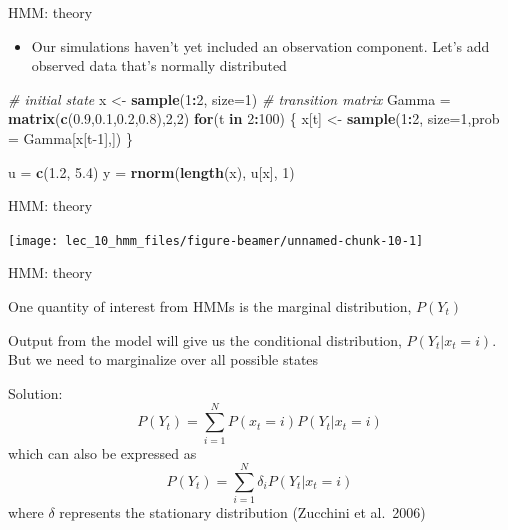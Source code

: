 \documentclass[
  ignorenonframetext,
]{beamer}
\newenvironment{Shaded}{\begin{snugshade}}{\end{snugshade}}
\newcommand{\CommentTok}[1]{\textcolor[rgb]{0.56,0.35,0.01}{\textit{#1}}}
\newcommand{\ControlFlowTok}[1]{\textcolor[rgb]{0.13,0.29,0.53}{\textbf{#1}}}
\newcommand{\DataTypeTok}[1]{\textcolor[rgb]{0.13,0.29,0.53}{#1}}
\newcommand{\DecValTok}[1]{\textcolor[rgb]{0.00,0.00,0.81}{#1}}
\newcommand{\FloatTok}[1]{\textcolor[rgb]{0.00,0.00,0.81}{#1}}
\newcommand{\KeywordTok}[1]{\textcolor[rgb]{0.13,0.29,0.53}{\textbf{#1}}}
\newcommand{\NormalTok}[1]{#1}
\newcommand{\OperatorTok}[1]{\textcolor[rgb]{0.81,0.36,0.00}{\textbf{#1}}}
\newcommand{\StringTok}[1]{\textcolor[rgb]{0.31,0.60,0.02}{#1}}
\providecommand{\tightlist}{%
  \setlength{\itemsep}{0pt}\setlength{\parskip}{0pt}}
\begin{document}
\begin{frame}[fragile]{HMM: theory}
\protect\hypertarget{hmm-theory-6}{}

\begin{itemize}
\tightlist
\item
  Our simulations haven't yet included an observation component. Let's
  add observed data that's normally distributed
\end{itemize}

\begin{Shaded}
\begin{Highlighting}[]
\CommentTok{# initial state}
\NormalTok{x <-}\StringTok{ }\KeywordTok{sample}\NormalTok{(}\DecValTok{1}\OperatorTok{:}\DecValTok{2}\NormalTok{, }\DataTypeTok{size=}\DecValTok{1}\NormalTok{)}
\CommentTok{# transition matrix}
\NormalTok{Gamma =}\StringTok{ }\KeywordTok{matrix}\NormalTok{(}\KeywordTok{c}\NormalTok{(}\FloatTok{0.9}\NormalTok{,}\FloatTok{0.1}\NormalTok{,}\FloatTok{0.2}\NormalTok{,}\FloatTok{0.8}\NormalTok{),}\DecValTok{2}\NormalTok{,}\DecValTok{2}\NormalTok{)}
\ControlFlowTok{for}\NormalTok{(t }\ControlFlowTok{in} \DecValTok{2}\OperatorTok{:}\DecValTok{100}\NormalTok{) \{}
\NormalTok{  x[t] <-}\StringTok{ }\KeywordTok{sample}\NormalTok{(}\DecValTok{1}\OperatorTok{:}\DecValTok{2}\NormalTok{, }\DataTypeTok{size=}\DecValTok{1}\NormalTok{,}\DataTypeTok{prob =}\NormalTok{ Gamma[x[t}\DecValTok{-1}\NormalTok{],])}
\NormalTok{\}}

\NormalTok{u =}\StringTok{ }\KeywordTok{c}\NormalTok{(}\FloatTok{1.2}\NormalTok{, }\FloatTok{5.4}\NormalTok{)}
\NormalTok{y =}\StringTok{ }\KeywordTok{rnorm}\NormalTok{(}\KeywordTok{length}\NormalTok{(x), u[x], }\DecValTok{1}\NormalTok{)}
\end{Highlighting}
\end{Shaded}

\end{frame}

\begin{frame}{HMM: theory}
\protect\hypertarget{hmm-theory-7}{}

\begin{center}\texttt{[image: lec\_10\_hmm\_files/figure-beamer/unnamed-chunk-10-1]} \end{center}

\end{frame}

\begin{frame}{HMM: theory}
\protect\hypertarget{hmm-theory-8}{}

One quantity of interest from HMMs is the marginal distribution,
\(P(Y_{t})\)

Output from the model will give us the conditional distribution,
\(P(Y_{t}|x_{t}=i)\). But we need to marginalize over all possible
states

Solution:
\[P(Y_{ t })=\sum _{ i=1 }^{ N }{ P({ x }_{ t }=i)P({ Y }_{ t }|{ x }_{ t }=i) }\]
which can also be expressed as
\[P(Y_{ t })=\sum _{ i=1 }^{ N }{ { \delta  }_{ i }P({ Y }_{ t }|{ x }_{ t }=i) }\]
where \(\delta\) represents the stationary distribution (Zucchini et
al.~2006)

\end{frame}
\end{document}
